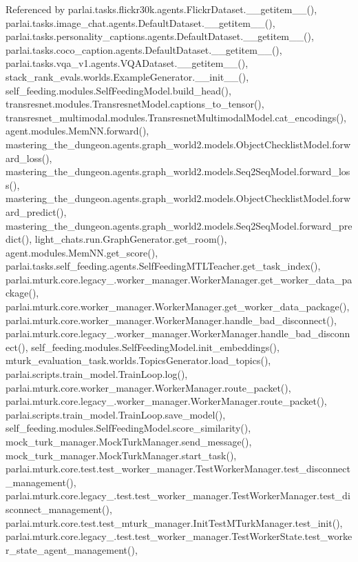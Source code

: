 Referenced by parlai.\+tasks.\+flickr30k.\+agents.\+Flickr\+Dataset.\+\_\+\+\_\+getitem\+\_\+\+\_\+(), parlai.\+tasks.\+image\+\_\+chat.\+agents.\+Default\+Dataset.\+\_\+\+\_\+getitem\+\_\+\+\_\+(), parlai.\+tasks.\+personality\+\_\+captions.\+agents.\+Default\+Dataset.\+\_\+\+\_\+getitem\+\_\+\+\_\+(), parlai.\+tasks.\+coco\+\_\+caption.\+agents.\+Default\+Dataset.\+\_\+\+\_\+getitem\+\_\+\+\_\+(), parlai.\+tasks.\+vqa\+\_\+v1.\+agents.\+V\+Q\+A\+Dataset.\+\_\+\+\_\+getitem\+\_\+\+\_\+(), stack\+\_\+rank\+\_\+evals.\+worlds.\+Example\+Generator.\+\_\+\+\_\+init\+\_\+\+\_\+(), self\+\_\+feeding.\+modules.\+Self\+Feeding\+Model.\+build\+\_\+head(), transresnet.\+modules.\+Transresnet\+Model.\+captions\+\_\+to\+\_\+tensor(), transresnet\+\_\+multimodal.\+modules.\+Transresnet\+Multimodal\+Model.\+cat\+\_\+encodings(), agent.\+modules.\+Mem\+N\+N.\+forward(), mastering\+\_\+the\+\_\+dungeon.\+agents.\+graph\+\_\+world2.\+models.\+Object\+Checklist\+Model.\+forward\+\_\+loss(), mastering\+\_\+the\+\_\+dungeon.\+agents.\+graph\+\_\+world2.\+models.\+Seq2\+Seq\+Model.\+forward\+\_\+loss(), mastering\+\_\+the\+\_\+dungeon.\+agents.\+graph\+\_\+world2.\+models.\+Object\+Checklist\+Model.\+forward\+\_\+predict(), mastering\+\_\+the\+\_\+dungeon.\+agents.\+graph\+\_\+world2.\+models.\+Seq2\+Seq\+Model.\+forward\+\_\+predict(), light\+\_\+chats.\+run.\+Graph\+Generator.\+get\+\_\+room(), agent.\+modules.\+Mem\+N\+N.\+get\+\_\+score(), parlai.\+tasks.\+self\+\_\+feeding.\+agents.\+Self\+Feeding\+M\+T\+L\+Teacher.\+get\+\_\+task\+\_\+index(), parlai.\+mturk.\+core.\+legacy\+\_.\+worker\+\_\+manager.\+Worker\+Manager.\+get\+\_\+worker\+\_\+data\+\_\+package(), parlai.\+mturk.\+core.\+worker\+\_\+manager.\+Worker\+Manager.\+get\+\_\+worker\+\_\+data\+\_\+package(), parlai.\+mturk.\+core.\+worker\+\_\+manager.\+Worker\+Manager.\+handle\+\_\+bad\+\_\+disconnect(), parlai.\+mturk.\+core.\+legacy\+\_.\+worker\+\_\+manager.\+Worker\+Manager.\+handle\+\_\+bad\+\_\+disconnect(), self\+\_\+feeding.\+modules.\+Self\+Feeding\+Model.\+init\+\_\+embeddings(), mturk\+\_\+evaluation\+\_\+task.\+worlds.\+Topics\+Generator.\+load\+\_\+topics(), parlai.\+scripts.\+train\+\_\+model.\+Train\+Loop.\+log(), parlai.\+mturk.\+core.\+worker\+\_\+manager.\+Worker\+Manager.\+route\+\_\+packet(), parlai.\+mturk.\+core.\+legacy\+\_.\+worker\+\_\+manager.\+Worker\+Manager.\+route\+\_\+packet(), parlai.\+scripts.\+train\+\_\+model.\+Train\+Loop.\+save\+\_\+model(), self\+\_\+feeding.\+modules.\+Self\+Feeding\+Model.\+score\+\_\+similarity(), mock\+\_\+turk\+\_\+manager.\+Mock\+Turk\+Manager.\+send\+\_\+message(), mock\+\_\+turk\+\_\+manager.\+Mock\+Turk\+Manager.\+start\+\_\+task(), parlai.\+mturk.\+core.\+test.\+test\+\_\+worker\+\_\+manager.\+Test\+Worker\+Manager.\+test\+\_\+disconnect\+\_\+management(), parlai.\+mturk.\+core.\+legacy\+\_.\+test.\+test\+\_\+worker\+\_\+manager.\+Test\+Worker\+Manager.\+test\+\_\+disconnect\+\_\+management(), parlai.\+mturk.\+core.\+test.\+test\+\_\+mturk\+\_\+manager.\+Init\+Test\+M\+Turk\+Manager.\+test\+\_\+init(), parlai.\+mturk.\+core.\+legacy\+\_.\+test.\+test\+\_\+worker\+\_\+manager.\+Test\+Worker\+State.\+test\+\_\+worker\+\_\+state\+\_\+agent\+\_\+management(), 